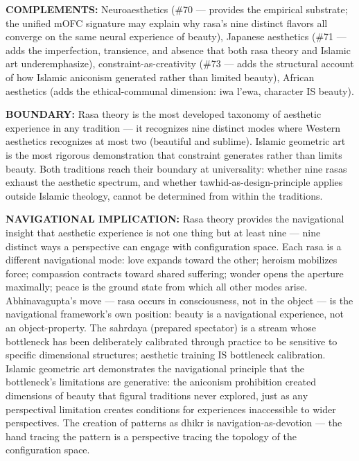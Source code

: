 \textbf{COMPLEMENTS:} Neuroaesthetics (\#70 — provides the empirical substrate; the unified mOFC signature may explain why rasa's nine distinct flavors all converge on the same neural experience of beauty), Japanese aesthetics (\#71 — adds the imperfection, transience, and absence that both rasa theory and Islamic art underemphasize), constraint-as-creativity (\#73 — adds the structural account of how Islamic aniconism generated rather than limited beauty), African aesthetics (adds the ethical-communal dimension: iwa l'ewa, character IS beauty).


\textbf{BOUNDARY:} Rasa theory is the most developed taxonomy of aesthetic experience in any tradition — it recognizes nine distinct modes where Western aesthetics recognizes at most two (beautiful and sublime). Islamic geometric art is the most rigorous demonstration that constraint generates rather than limits beauty. Both traditions reach their boundary at universality: whether nine rasas exhaust the aesthetic spectrum, and whether tawhid-as-design-principle applies outside Islamic theology, cannot be determined from within the traditions.


\textbf{NAVIGATIONAL IMPLICATION:} Rasa theory provides the navigational insight that aesthetic experience is not one thing but at least nine — nine distinct ways a perspective can engage with configuration space. Each rasa is a different navigational mode: love expands toward the other; heroism mobilizes force; compassion contracts toward shared suffering; wonder opens the aperture maximally; peace is the ground state from which all other modes arise. Abhinavagupta's move — rasa occurs in consciousness, not in the object — is the navigational framework's own position: beauty is a navigational experience, not an object-property. The sahrdaya (prepared spectator) is a stream whose bottleneck has been deliberately calibrated through practice to be sensitive to specific dimensional structures; aesthetic training IS bottleneck calibration. Islamic geometric art demonstrates the navigational principle that the bottleneck's limitations are generative: the aniconism prohibition created dimensions of beauty that figural traditions never explored, just as any perspectival limitation creates conditions for experiences inaccessible to wider perspectives. The creation of patterns as dhikr is navigation-as-devotion — the hand tracing the pattern is a perspective tracing the topology of the configuration space.


\bigskip\noindent\makebox[\textwidth]{\color{rulegray}\rule{5cm}{0.3pt}}\bigskip


